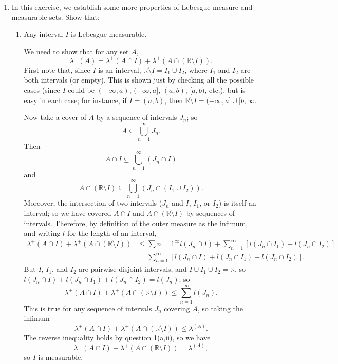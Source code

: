 \documentclass{article}
\let\take\setminus
\let\lamdba\lambda
\begin{document}
\begin{enumerate}
\begin{enumerate}
						{\color{blue}
							We've actually already shown this! It was equation ($\star\star$) in the proof of part (b,iii). So at least all that hard work there saved us some work here!
						}
					
		\end{enumerate}
	\item In this exercise, we establish some more properties of Lebesgue measure and measurable sets. Show that:
		\begin{enumerate}
			\item Any interval $I$ is Lebesgue-measurable.
			
						{\color{blue}
							We need to show that for any set $A$,
							\[\lambda^+(A)=\lambda^+(A\cap I)+\lambda^+(A\cap(\mathbb{R}\take I)).\]
							First note that, since $I$ is an interval, $\mathbb{R}\take I=I_1\cup I_2$, where $I_1$ and $I_2$ are both intervals (or empty). This is shown just by checking all the possible cases (since $I$ could be $(-\infty,a)$, $(-\infty,a]$, $(a,b)$, $[a,b)$, etc.), but is easy in each case; for instance, if $I=(a,b)$, then $\mathbb{R}\take I=(-\infty,a]\cup[b,\infty$.
							
							Now take a cover of $A$ by a sequence of intervals $J_n$; so
							\[A\subseteq \bigcup_{n=1}^\infty J_n.\]
							Then
							\[A\cap I\subseteq \bigcup_{n=1}^\infty (J_n\cap I)\]
							and
							\[A\cap(\mathbb{R}\take I)\subseteq\bigcup_{n=1}^\infty (J_n\cap(I_1\cup I_2)).\]
							Moreover, the intersection of two intervals ($J_n$ and $I$, $I_1$, or $I_2$) is itself an interval; so we have covered $A\cap I$ and $A\cap(\mathbb{R}\take I)$ by sequences of intervals. Therefore, by definition of the outer measure as the infimum, and writing $l$ for the length of an interval,
							\begin{align*}
								\lambda^+(A\cap I)+\lambda^+(A\cap(\mathbb{R}\take I))&\leq \sum{n=1}^\infty l(J_n\cap I) + \sum_{n=1}^\infty [l(J_n\cap I_1)+l(J_n\cap I_2)]\\
								&=\sum_{n=1}^\infty[l(J_n\cap I)+l(J_n\cap I_1) + l(J_n\cap I_2)].
							\end{align*}
							But $I$, $I_1$, and $I_2$ are pairwise disjoint intervals, and $I\cup I_1\cup I_2=\mathbb{R}$, so $l(J_n\cap I)+l(J_n\cap I_1)+l(J_n\cap I_2)=l(J_n)$; so
							\[\lambda^+(A\cap I)+\lambda^+(A\cap(\mathbb{R}\take I))\leq \sum_{n=1}^\infty l(J_n).\]
							This is true for any sequence of intervals $J_n$ covering $A$, so taking the infimum
							\[\lambda^+(A\cap I)+\lambda^+(A\cap(\mathbb{R}\take I))\leq \lamdba^(A).\]
							The reverse inequality holds by question 1(a,ii), so we have
							\[\lambda^+(A\cap I)+\lambda^+(A\cap(\mathbb{R}\take I))= \lamdba^(A),\]
							so $I$ is measurable.
						}
					

\end{enumerate}
\end{enumerate}
\end{document}
